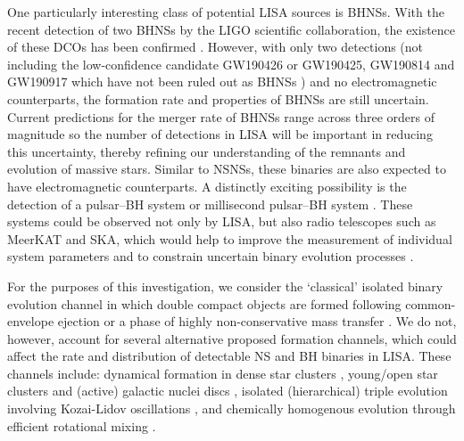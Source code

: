 One particularly interesting class of potential LISA sources is BHNSs. With the recent detection of two BHNSs by the LIGO scientific collaboration, the existence of these DCOs has been confirmed \citep{TheLIGOScientificCollaboration+2021}. However, with only two detections (not including the low-confidence candidate GW190426 \citealt{Abbott+2020_GWTC2} or GW190425, GW190814 and GW190917 which have not been ruled out as BHNSs \citealt{Abbott+2020_GW190425,Abbott+2020_GW190814, GWTC_2_1} ) and no electromagnetic counterparts, the formation rate and properties of BHNSs are still uncertain. Current predictions for the merger rate of BHNSs range across three orders of magnitude \citep[e.g.][]{Abadie+2010, Mandel+2021} so the number of detections in LISA will be important in reducing this uncertainty, thereby refining our understanding of the remnants and evolution of massive stars. Similar to NSNSs, these binaries are also expected to have electromagnetic counterparts. A distinctly exciting possibility is the detection of a pulsar--BH system or millisecond pulsar--BH system \citep{Narayan+1991, Pol+2021}. These systems could be observed not only by LISA, but also radio telescopes such as MeerKAT and SKA, which would help to improve the measurement of individual system parameters and to constrain uncertain binary evolution processes \citep[e.g.][]{Pfahl+2005,Chattopadhyay+2020}.

For the purposes of this investigation, we consider the `classical' isolated binary evolution channel \citep[e.g.][]{Tutukov+1973,Tutukov+1993,Smarr+1976,Srinivasan+1989,Kalogera+2007,Belczynski+2016} in which double compact objects are formed following common-envelope ejection or a phase of highly non-conservative mass transfer \citep{Heuvel+2011, vandenHeuvel+2017}. We do not, however, account for several alternative proposed formation channels, which could affect the rate and distribution of detectable NS and BH binaries in LISA. These channels include: dynamical formation in dense star clusters \citep[e.g.][]{Sigurdsson+1993,PortegiesZwart+2000,Miller+2009,Rodriguez+2015}, young/open star clusters \citep[e.g.][]{Ziosi+2014, DiCarlo+2020, Rastello+2020, Rastello+2021} and (active) galactic nuclei discs \citep[e.g.][]{Morris+1993, Antonini+2016, McKernan+2020}, isolated (hierarchical) triple evolution involving Kozai-Lidov oscillations \citep[e.g.][]{Stephan+2016, Silsbee+2017,Antonini+2017, Toonen+2020},  and chemically homogenous evolution through efficient rotational mixing \citep[e.g.][]{deMink+2009,Mandel+2016,Marchant+2016,Marchant+2017,duBuisson+2020}.

